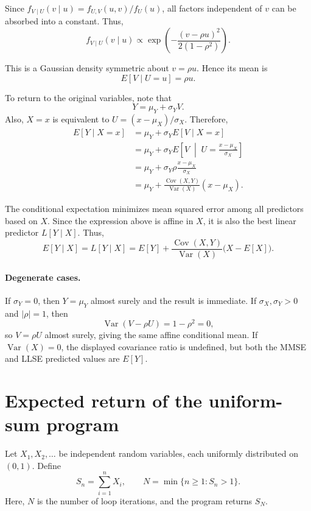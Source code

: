 \documentclass[11pt,a4paper]{article}
\begin{document}
Since \(f_{V\mid U}(v\mid u)=f_{U,V}(u,v)/f_U(u)\),
all factors independent of \(v\) can be absorbed into
a constant. Thus,
\[
f_{V\mid U}(v\mid u)
\propto
\exp\left(
-\frac{(v-\rho u)^2}{2(1-\rho^2)}
\right).
\]

This is a Gaussian density symmetric about \(v=\rho u\).
Hence its mean is
\[
E[V\mid U=u]=\rho u.
\]

To return to the original variables, note that
\[
Y=\mu_Y+\sigma_YV.
\]
Also, \(X=x\) is equivalent to
\(U=(x-\mu_X)/\sigma_X\). Therefore,
\[
\begin{aligned}
E[Y\mid X=x]
&=\mu_Y+\sigma_Y E[V\mid X=x]\\
&=\mu_Y+\sigma_Y
E\left[V\;\middle|\;U=\frac{x-\mu_X}{\sigma_X}\right]\\
&=\mu_Y+\sigma_Y\rho\frac{x-\mu_X}{\sigma_X}\\
&=\mu_Y+
\frac{\operatorname{Cov}(X,Y)}{\operatorname{Var}(X)}
(x-\mu_X).
\end{aligned}
\]

The conditional expectation minimizes mean squared error
among all predictors based on \(X\). Since the expression
above is affine in \(X\), it is also the best linear
predictor \(L[Y\mid X]\). Thus,
\[
E[Y\mid X]
=L[Y\mid X]
=E[Y]
+\frac{\operatorname{Cov}(X,Y)}{\operatorname{Var}(X)}
\bigl(X-E[X]\bigr).
\]
\paragraph{Degenerate cases.}
If \(\sigma_Y=0\), then \(Y=\mu_Y\) almost surely and the result is immediate.
If \(\sigma_X,\sigma_Y>0\) and \(|\rho|=1\), then
\[
\operatorname{Var}(V-\rho U)=1-\rho^2=0,
\]
so \(V=\rho U\) almost surely, giving the same affine conditional mean.
If \(\operatorname{Var}(X)=0\), the displayed covariance ratio is undefined,
but both the MMSE and LLSE predicted values are \(E[Y]\).

\section{Expected return of the uniform-sum program}

Let $X_1,X_2,\ldots$ be independent random variables, each uniformly
distributed on $(0,1)$. Define
\[
S_n=\sum_{i=1}^{n}X_i,
\qquad
N=\min\{n\geq 1:S_n>1\}.
\]
Here, $N$ is the number of loop iterations, and the program returns $S_N$.
\end{document}
